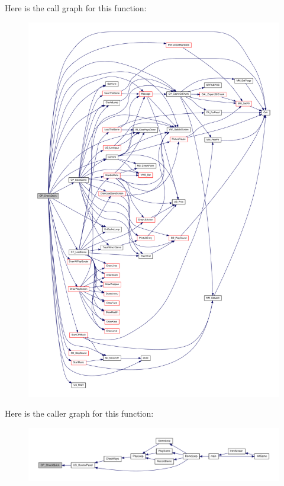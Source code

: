 Here is the call graph for this function:
\nopagebreak
\begin{figure}[H]
\begin{center}
\leavevmode
\includegraphics[width=400pt]{WL__MENU_8H_a95a8089ef599aecc8a81f90ba35032dd_cgraph}
\end{center}
\end{figure}




Here is the caller graph for this function:
\nopagebreak
\begin{figure}[H]
\begin{center}
\leavevmode
\includegraphics[width=400pt]{WL__MENU_8H_a95a8089ef599aecc8a81f90ba35032dd_icgraph}
\end{center}
\end{figure}


